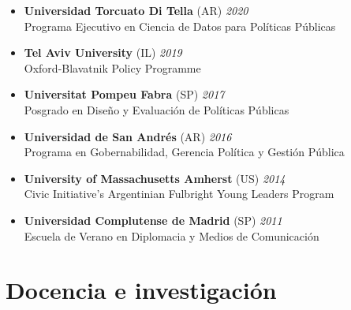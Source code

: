 \documentclass[12pt]{article}
\begin{document}
\begin{itemize}

    \item {\bf Universidad Torcuato Di Tella} (AR) \hfill {\em 2020} \\ 
    Programa Ejecutivo en Ciencia de Datos para Políticas Públicas

    \item {\bf Tel Aviv University} (IL) \hfill {\em 2019} \\ 
    Oxford-Blavatnik Policy Programme

    \item {\bf Universitat Pompeu Fabra} (SP) \hfill {\em 2017} \\ 
    Posgrado en Diseño y Evaluación de Políticas Públicas
    
    \item {\bf Universidad de San Andrés} (AR) \hfill {\em 2016} \\ 
    Programa en Gobernabilidad, Gerencia Política y Gestión Pública

    \item {\bf University of Massachusetts Amherst} (US) \hfill {\em 2014} \\ 
    Civic Initiative's Argentinian Fulbright Young Leaders Program
    
    \item {\bf Universidad Complutense de Madrid} (SP) \hfill {\em 2011} \\ 
    Escuela de Verano en Diplomacia y Medios de Comunicación

\end{itemize}

\section*{Docencia e investigación}
\end{document}

